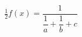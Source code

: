 \documentclass[nofonts]{ctexart}
\begin{document}
\[
	\tfrac{1}{2} f(x) = \frac{1}{\dfrac{1}{a} + \dfrac{1}{b} +c}
\]
\end{document}

